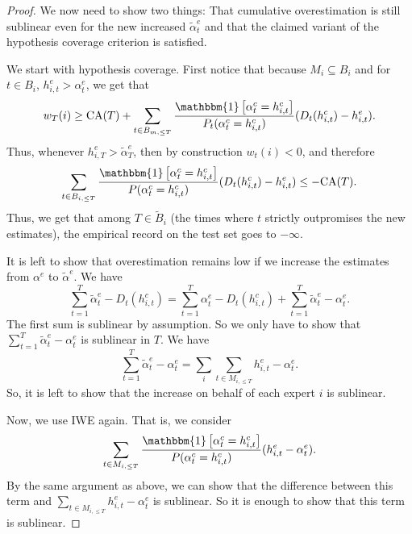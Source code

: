 \documentclass[submission,copyright,creativecommons]{eptcs}
\begin{document}
\begin{extendedonlyblock}
\begin{proof}
We now need to show two things: That cumulative overestimation is still sublinear even for the new increased $\tilde \alpha_t^e$ and that the claimed variant of the hypothesis coverage criterion is satisfied.

We start with hypothesis coverage. First notice that because $M_i\subseteq B_i$ and for $t\in B_i$, $h_{i,t}^e> \alpha_{t}^e$, we get that
\begin{equation*}
w_{T}(i) \geq  \mathrm{CA}(T) +  \sum_{t\in B_{m,\leq T}} \frac{\mathbbm{1}\left[\alpha_t^c=h_{i,t}^c\right]}{ P_t(\alpha_t^c=h_{i,t}^c)} (D_t(h^c_{i,t}) - h_{i,t}^e).
\end{equation*}
Thus, whenever $h_{i,T}^e>\tilde \alpha_T^e$, then by construction $w_t(i)< 0$, and therefore
\begin{equation*}
\sum_{t\in B_{i,\leq T}} \frac{\mathbbm{1}\left[\alpha_t^c=h_{i,t}^c\right]}{ P(\alpha_t^c=h_{i,t}^c)} (D_t(h^c_{i,t}) - h_{i,t}^e) \leq -\mathrm{CA}(T).
\end{equation*}
Thus, we get that among $T\in \tilde B_{i}$ (the times where $t$ strictly outpromises the new estimates), the empirical record on the test set goes to $-\infty$.

It is left to show that overestimation remains low if we increase the estimates from $\alpha^e$ to $\tilde \alpha^e$. We have
\begin{equation*}
\sum_{t=1}^T \tilde \alpha_t^e - D_t(h_{i,t}^c) = \sum_{t=1}^T \alpha_t^e - D_t(h_{i,t}^c)+ \sum_{t=1}^T \tilde \alpha_t^e - \alpha_t^e .
\end{equation*}
The first sum is sublinear by assumption. So we only have to show that $\sum_{t=1}^T \tilde \alpha_t^e - \alpha_t^e$ is sublinear in $T$.
We have
\begin{equation}\label{line:increase-of-estimates-on-behalf-of-m}
\sum_{t=1}^T \tilde \alpha_t^e - \alpha_t^e = \sum_i \sum_{t\in M_{i,\leq T}}  h_{i,t}^e - \alpha_t^e.
\end{equation}
So, it is left to show that the increase on behalf of each expert $i$ is sublinear.

Now, we use IWE again. That is, we consider
\begin{equation*}
\sum_{t\in M_{i,\leq T}} \frac{\mathbbm{1}\left[\alpha_t^c=h_{i,t}^c\right]}{ P(\alpha_t^c=h_{i,t}^c)} (h_{i,t}^e - \alpha_t^e).
\end{equation*}
By the same argument as above, we can show that the difference between this term and $\sum_{t\in M_{i,\leq T}}  h_{i,t}^e - \alpha_t^e$ is sublinear. So it is enough to show that this term is sublinear.


\end{proof}
\end{extendedonlyblock}
\end{document}

